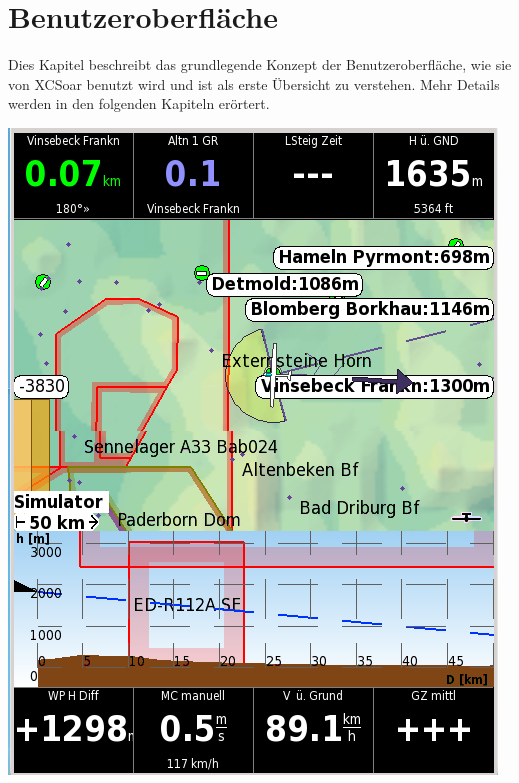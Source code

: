 \chapter{Benutzeroberfläche}\label{cha:interface}

Dies Kapitel beschreibt das grundlegende  Konzept der Benutzeroberfläche, wie sie von \textsf{XCSoar} benutzt wird und ist als erste Übersicht zu verstehen. Mehr Details werden in den folgenden Kapiteln erörtert.

\begin{center}
\includegraphics[angle=0,width=0.75\linewidth,keepaspectratio='true']{figures/plain.png}
\end{center}

